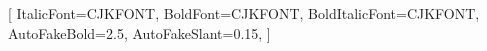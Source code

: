 %
\usepackage{ucharclasses}
\newfontfamily{}[
  ItalicFont={CJKFONT},
  BoldFont={CJKFONT},
  BoldItalicFont={CJKFONT},
  AutoFakeBold=2.5,
  AutoFakeSlant=0.15,
]
\setTransitionsForCJK{\btfCJKfont}{\normalfont}
